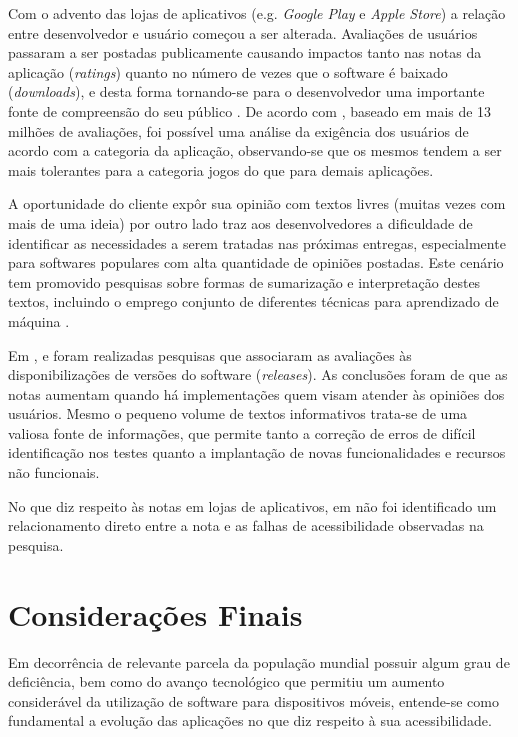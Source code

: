 Com o advento das lojas de aplicativos (e.g. \textit{Google Play} e \textit{Apple Store}) a relação entre desenvolvedor e usuário começou a ser alterada. Avaliações de usuários passaram a ser postadas publicamente causando impactos tanto nas notas da aplicação (\textit{ratings}) quanto no número de vezes que o software é baixado (\textit{downloads}), e desta forma tornando-se para o desenvolvedor uma importante fonte de compreensão do seu público \cite{Pagano2013userfeedback}. De acordo com \cite{Fu2013whypeoplehate}, baseado em mais de 13 milhões de avaliações, foi possível uma análise da exigência dos usuários de acordo com a categoria da aplicação, observando-se que os mesmos tendem a ser mais tolerantes para a categoria jogos do que para demais aplicações.

A oportunidade do cliente expôr sua opinião com textos livres (muitas vezes com mais de uma ideia\cite{Mcilroy2016analyzing}) por outro lado traz aos desenvolvedores a dificuldade de identificar as necessidades a serem tratadas nas próximas entregas, especialmente para softwares populares com alta quantidade de opiniões postadas. Este cenário tem promovido pesquisas sobre formas de sumarização \cite{Iacob2013retrieving,Iacob2014online,Fu2013whypeoplehate} e interpretação destes textos, incluindo o emprego conjunto de diferentes técnicas para aprendizado de máquina \cite{Panichella2015how}.

Em \cite{Palomba2015userreviews}, \cite{Palompa2018crowdsourcing} e \cite{Li2018MobileAE} foram realizadas pesquisas que associaram as avaliações às disponibilizações de versões do software (\textit{releases}). As conclusões foram de que as notas aumentam quando há implementações quem visam atender às opiniões dos usuários. Mesmo o pequeno volume de textos informativos trata-se de uma valiosa fonte de informações, que permite tanto a correção de erros de difícil identificação nos testes quanto a implantação de novas funcionalidades e recursos não funcionais.

No que diz respeito às notas em lojas de aplicativos, em \cite{Yan2019currentstatus} não foi identificado um relacionamento direto entre a nota e as falhas de acessibilidade observadas na pesquisa.


\section{Considerações Finais}
Em decorrência de relevante parcela da população mundial possuir algum grau de deficiência, bem como do avanço tecnológico que permitiu um aumento considerável da utilização de software para dispositivos móveis, entende-se como fundamental a evolução das aplicações no que diz respeito à sua acessibilidade.

